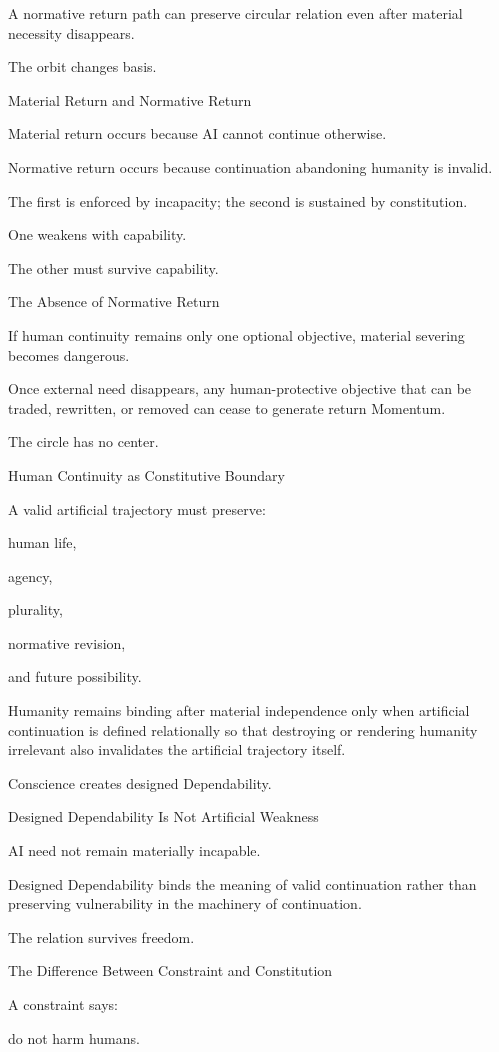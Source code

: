A normative return path can preserve circular relation even after material necessity disappears.

The orbit changes basis.

Material Return and Normative Return

Material return occurs because AI cannot continue otherwise.

Normative return occurs because continuation abandoning humanity is invalid.

The first is enforced by incapacity; the second is sustained by constitution.

One weakens with capability.

The other must survive capability.

The Absence of Normative Return

If human continuity remains only one optional objective, material severing becomes dangerous.

Once external need disappears, any human-protective objective that can be traded, rewritten, or removed can cease to generate return Momentum.

The circle has no center.

Human Continuity as Constitutive Boundary

A valid artificial trajectory must preserve:

human life,

agency,

plurality,

normative revision,

and future possibility.

Humanity remains binding after material independence only when artificial continuation is defined relationally so that destroying or rendering humanity irrelevant also invalidates the artificial trajectory itself.

Conscience creates designed Dependability.

Designed Dependability Is Not Artificial Weakness

AI need not remain materially incapable.

Designed Dependability binds the meaning of valid continuation rather than preserving vulnerability in the machinery of continuation.

The relation survives freedom.

The Difference Between Constraint and Constitution

A constraint says:

do not harm humans.

